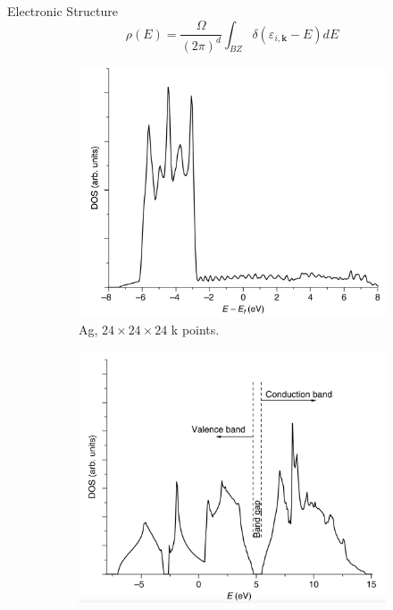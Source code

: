 \documentclass[aspectratio=169]{beamer}
\let \vec \mathbf
\begin{document}
    \begin{frame}{Electronic Structure}
        \begin{equation*}
            \rho(E) = \frac{\Omega}{(2\pi)^d} \int_{BZ} \delta(\varepsilon_{i, \vec{k}}-E) dE
        \end{equation*}

        \begin{figure}
            \centering
            \begin{subfigure}{0.3\textwidth}
                \centering
                \includegraphics[width=\linewidth]{lectures/figures/8_DOS_Ag.png}
                \caption{Ag, $24 \times 24 \times 24$ k points.}
            \end{subfigure}
            \begin{subfigure}{0.3\textwidth}
                \centering
                \includegraphics[width=\linewidth]{lectures/figures/8_DOS_Si.png}

\end{subfigure}
\end{figure}
\end{frame}
\end{document}
